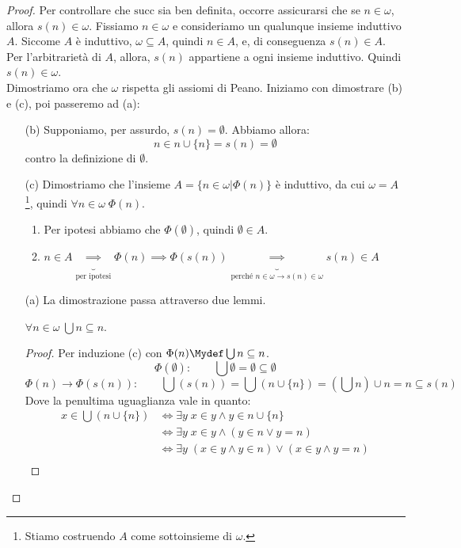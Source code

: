 \documentclass[11pt]{scrartcl}
\begin{document}
\begin{proof}
	Per controllare che $\text{succ}$ sia ben definita, occorre assicurarsi che se $n \in \omega$, allora $s(n) \in \omega$. Fissiamo $n \in \omega$
	e consideriamo un qualunque insieme induttivo $A$. Siccome $A$ è induttivo, $\omega \subseteq A$, quindi $n \in A$, e, di conseguenza $s(n) \in A$. Per 
	l'arbitrarietà di $A$, allora, $s(n)$ appartiene a ogni insieme induttivo. Quindi $s(n) \in \omega$.\\
	Dimostriamo ora che $\omega$ rispetta gli assiomi di Peano. Iniziamo con dimostrare (b) e (c), poi passeremo ad (a):
	\begin{enumerate}
		\item[(b)] Supponiamo, per assurdo, $s(n) = \emptyset$. Abbiamo allora:
		\[ n \in n \cup \{n\} = s(n) = \emptyset
			\]
		contro la definizione di $\emptyset$.
		\item[(c)] Dimostriamo che l'insieme $A = \{n \in \omega | \Phi(n)\}$ è induttivo, da cui $\omega = A$\footnote{Stiamo costruendo $A$ come sottoinsieme di $\omega$.}, quindi $\forall n \in \omega \; \Phi(n)$.
		\begin{enumerate}[1.]
			\item Per ipotesi abbiamo che $\Phi(\emptyset)$, quindi $\emptyset \in A$.
			\item $n \in A \underbrace{\implies}_{\text{per ipotesi}} \Phi(n) \implies \Phi(s(n)) \underbrace{\implies}_{\text{perché $n \in \omega \rightarrow s(n) \in \omega$}} s(n) \in A$
		\end{enumerate}
		\item[(a)] La dimostrazione passa attraverso due lemmi.
					\begin{lemma}
					[Lemma 1]
					$\forall n \in \omega \; \bigcup n \subseteq n$.
					\end{lemma}
					\begin{proof}
						Per induzione (c) con $\Phi(n) \Mydef \bigcup n \subseteq n$.
						\[ \Phi(\emptyset): \qquad \bigcup \emptyset = \emptyset \subseteq \emptyset
							\]\[ \Phi(n) \rightarrow \Phi(s(n)): \qquad \bigcup(s(n)) = \bigcup(n \cup \{n\}) = \left(\bigcup n\right) \cup n = n \subseteq s(n)
								\]
						Dove la penultima uguaglianza vale in quanto:
						\[ \begin{split}
							x \in \bigcup(n \cup \{n\}) & \iff \exists y \; x \in y \land y \in n \cup\{n\}\\
														& \iff \exists y \; x \in y \land (y \in n \lor y = n)\\
														& \iff \exists y \; ( x \in y \land y \in n) \lor (x \in y \land y = n)\\

\end{split}\]
\end{proof}
\end{enumerate}
\end{proof}
\end{document}
